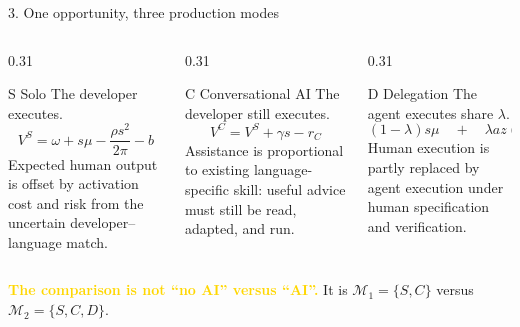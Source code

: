 \documentclass[aspectratio=169,10pt]{beamer}
\newcommand{\weak}[1]{\textcolor{Gold}{\textbf{#1}}}
\begin{document}
\begin{frame}{3. One opportunity, three production modes}
  \vspace{0.05cm}
  \begin{columns}[T,onlytextwidth]
    \begin{column}{0.31\textwidth}
      \begin{block}{S \; Solo}
        The developer executes.
        \[
          V^S=\omega+s\mu-\frac{\rho s^2}{2\pi}-b
        \]
        \scriptsize Expected human output is offset by activation cost and risk from the uncertain developer--language match.
      \end{block}
    \end{column}
    \begin{column}{0.31\textwidth}
      \begin{block}{C \; Conversational AI}
        The developer still executes.
        \[
          V^C=V^S+\gamma s-r_C
        \]
        \scriptsize Assistance is proportional to existing language-specific skill: useful advice must still be read, adapted, and run.
      \end{block}
    \end{column}
    \begin{column}{0.31\textwidth}
      \begin{exampleblock}{D \; Delegation}
        The agent executes share $\lambda$.
        \[
          (1-\lambda)s\mu
          \quad+\quad
          \lambda a z(A)
        \]
        \scriptsize Human execution is partly replaced by agent execution under human specification and verification.
      \end{exampleblock}
    \end{column}
  \end{columns}

  \vspace{0.18cm}
  \begin{center}
    \weak{The comparison is not ``no AI'' versus ``AI''.}
    It is $\mathcal M_1=\{S,C\}$ versus $\mathcal M_2=\{S,C,D\}$.
  \end{center}
\end{frame}
\end{document}
